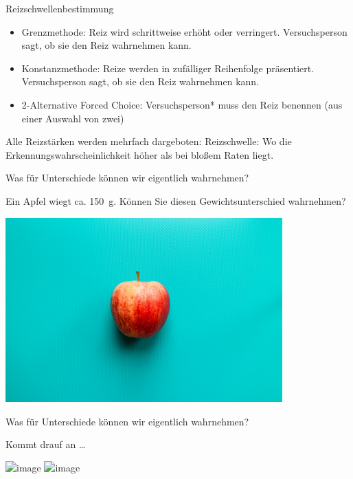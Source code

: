 \documentclass[aspectratio=169]{beamer}
\begin{document}


\begin{frame}{Reizschwellenbestimmung}

\begin{itemize}
    \item 
    Grenzmethode: Reiz wird schrittweise erhöht oder verringert. Versuchsperson sagt, ob sie den Reiz wahrnehmen kann.
    \item
    Konstanzmethode: Reize werden in zufälliger Reihenfolge präsentiert. Versuchsperson sagt, ob sie den Reiz wahrnehmen kann.
    \item
    2-Alternative Forced Choice: Versuchsperson* muss den Reiz benennen (aus einer Auswahl von zwei) 
\end{itemize}

Alle Reizstärken werden mehrfach dargeboten: Reizschwelle: Wo die Erkennungswahrscheinlichkeit höher als bei bloßem Raten liegt.


\end{frame}






\begin{frame}{Was für Unterschiede können wir eigentlich wahrnehmen?}

Ein Apfel wiegt ca. \SI{150}{\gram}. Können Sie diesen Gewichtsunterschied wahrnehmen? 


\begin{center}
    \includegraphics[width=0.8\textwidth]{louis-hansel-MardkT836BU-unsplash.jpg}
    
\end{center}

    
\end{frame}


\begin{frame}{Was für Unterschiede können wir eigentlich wahrnehmen?}

Kommt drauf an \dots

\begin{center}
    \includegraphics<1>[width=0.8\textwidth]{priscilla-du-preez-CoqJGsFVJtM-unsplash.jpg}
        \includegraphics<2>[width=0.8\textwidth]{liuba-bilyk-wU_TbWqdPJI-unsplash.jpg}

\end{center}

    
\end{frame}
\end{document}
